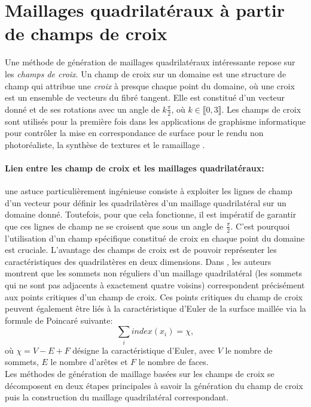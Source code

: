 \section{Maillages quadrilatéraux à partir de champs de croix}

Une méthode de génération de maillages quadrilatéraux intéressante repose sur les \emph{champs de croix}. Un champ de croix sur un domaine est une structure de champ qui attribue une \emph{croix} à presque chaque point du domaine, où une croix est un ensemble de vecteurs du fibré tangent. Elle est constitué d'un vecteur donné et de ses rotations avec un angle de $k\displaystyle\frac{\pi}{2}$, où $k \in \llbracket 0,3\rrbracket$. Les champs de croix sont utilisés pour la première fois dans les applications de graphisme informatique pour contrôler la mise en correspondance de surface pour le rendu non photoréaliste, la synthèse de textures et le ramaillage \cite{ray2008n, bommes2009mixed, nieser2011cubecover}.\\

\paragraph{Lien entre les champ de croix et les maillages quadrilatéraux:} une astuce particulièrement ingénieuse consiste à exploiter les lignes de champ d'un vecteur pour définir les quadrilatères d'un maillage quadrilatéral sur un domaine donné. Toutefois, pour que cela fonctionne, il est impératif de garantir que ces lignes de champ ne se croisent que sous un angle de $\frac{\pi}{2}$. C'est pourquoi l'utilisation d'un champ spécifique constitué de croix en chaque point du domaine est cruciale. L'avantage des champs de croix est de pouvoir représenter les caractéristiques des quadrilatères en deux dimensions. Dans \cite{beaufort2017computing}, les auteurs montrent que les sommets non réguliers d'un maillage quadrilatéral (les sommets qui ne sont pas adjacents à exactement quatre voisins) correspondent précisément aux points critiques d'un champ de croix. Ces points critiques du champ de croix peuvent également être liés à la caractéristique d'Euler de la surface maillée via la formule de Poincaré suivante:
$$
\sum_i index(x_i)=\chi,
$$
où $\chi=V-E+F$ désigne la caractéristique d'Euler, avec $V$ le nombre de sommets, $E$ le nombre d'arêtes et $F$ le nombre de faces.\\

Les méthodes de génération de maillage basées sur les champs de croix se décomposent en deux étapes principales à savoir la génération du champ de croix puis la construction du maillage quadrilatéral correspondant.

